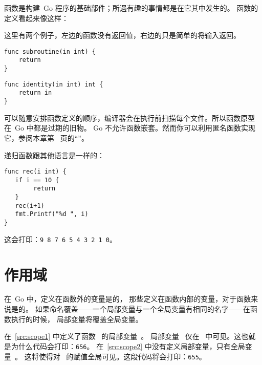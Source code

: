 
\noindent{}函数是构建~Go 程序的基础部件；所遇有趣的事情都是在它其中发生的。
函数的定义看起来像这样：

\showremarks
这里有两个例子，左边的函数没有返回值，右边的只是简单的将输入返回。

\begin{minipage}{.5\textwidth}
\begin{lstlisting}
func subroutine(in int) {
    return
}
\end{lstlisting}
\end{minipage}
\begin{minipage}{.5\textwidth}
\begin{lstlisting}
func identity(in int) int {
    return in
}
\end{lstlisting}
\end{minipage}

可以随意安排函数定义的顺序，编译器会在执行前扫描每个文件。所以函数原型在~Go 中都是过期的旧物。
Go 不允许函数嵌套。然而你可以利用匿名函数实现它，参阅本章第~\pageref{sec:functions as values}
页的``''。


递归函数跟其他语言是一样的：
\begin{lstlisting}[caption=递归函数]
func rec(i int) {
   if i == 10 {
        return
   }
   rec(i+1)
   fmt.Printf("%d ", i)
}
\end{lstlisting}
这会打印：\texttt{9 8 7 6 5 4 3 2 1 0}。

\section{作用域}
在~Go 中，定义在函数外的变量是的，
那些定义在函数内部的变量，对于函数来说是的。
如果命名覆盖——一个局部变量与一个全局变量有相同的名字——在函数执行的时候，
局部变量将覆盖全局变量。

\begin{minipage}{.5\textwidth}

\hfill
\vfill
\end{minipage}
\hfill
\begin{minipage}{.5\textwidth}

\hfill
\vfill
\end{minipage}

在~\ref{src:scope1} 中定义了函数~ 的局部变量~。
局部变量~ 仅在~ 中可见。这也就是为什么代码会打印：\texttt{656}。
在~\ref{src:scope2} 中没有定义局部变量，只有全局变量~。
这将使得对~ 的赋值全局可见。这段代码将会打印：\texttt{655}。

